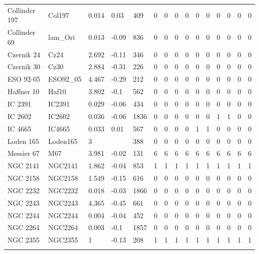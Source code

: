 \documentclass[fleqn,usenatbib]{mnras}
\begin{document}
\begin{table}
\begin{tabular}{|l l l l l || c c c c c | c c c c c|}
            Collinder 197 & Col197 & 0.014 & 0.03 & 409 & 0 & 0 & 0 & 0 & 0 & 0 & 0 & 0 & 0 & 0\\
            Collinder 69 & lam\_Ori & 0.013 & -0.09 & 836 & 0 & 0 & 0 & 0 & 0 & 0 & 0 & 0 & 0 & 0\\
            Czernik 24 & Cz24 & 2.692 & -0.11 & 346 & 0 & 0 & 0 & 0 & 0 & 0 & 0 & 0 & 0 & 0\\
            Czernik 30 & Cz30 & 2.884 & -0.31 & 226 & 0 & 0 & 0 & 0 & 0 & 0 & 0 & 0 & 0 & 0\\
            ESO 92-05 & ESO92\_05 & 4.467 & -0.29 & 212 & 0 & 0 & 0 & 0 & 0 & 0 & 0 & 0 & 0 & 0\\
            Haffner 10 & Haf10 & 3.802 & -0.1 & 562 & 0 & 0 & 0 & 0 & 0 & 0 & 0 & 0 & 0 & 0\\
            IC 2391 & IC2391 & 0.029 & -0.06 & 434 & 0 & 0 & 0 & 0 & 0 & 0 & 0 & 0 & 0 & 0\\
            \rowcolor{lightgray}
            IC 2602 & IC2602 & 0.036 & -0.06 & 1836 & 0 & 0 & 0 & 0 & 0 & 0 & 1 & 1 & 0 & 0\\
            \rowcolor{lightgray}
            IC 4665 & IC4665 & 0.033 & 0.01 & 567 & 0 & 0 & 0 & 0 & 1 & 1 & 0 & 0 & 0 & 0\\
            Loden 165 & Loden165 & 3 &  & 388 & 0 & 0 & 0 & 0 & 0 & 0 & 0 & 0 & 0 & 0\\
            \rowcolor{lightgray}
            Messier 67 & M67 & 3.981 & -0.02 & 131 & 6 & 6 & 6 & 6 & 6 & 6 & 6 & 6 & 6 & 6\\
            \rowcolor{lightgray}
            NGC 2141 & NGC2141 & 1.862 & -0.04 & 853 & 1 & 1 & 1 & 1 & 1 & 1 & 1 & 1 & 1 & 1\\
            NGC 2158 & NGC2158 & 1.549 & -0.15 & 616 & 0 & 0 & 0 & 0 & 0 & 0 & 0 & 0 & 0 & 0\\
            NGC 2232 & NGC2232 & 0.018 & -0.03 & 1866 & 0 & 0 & 0 & 0 & 0 & 0 & 0 & 0 & 0 & 0\\
            NGC 2243 & NGC2243 & 4.365 & -0.45 & 661 & 0 & 0 & 0 & 0 & 0 & 0 & 0 & 0 & 0 & 0\\
            NGC 2244 & NGC2244 & 0.004 & -0.04 & 452 & 0 & 0 & 0 & 0 & 0 & 0 & 0 & 0 & 0 & 0\\
            NGC 2264 & NGC2264 & 0.003 & -0.1 & 1857 & 0 & 0 & 0 & 0 & 0 & 0 & 0 & 0 & 0 & 0\\
            \rowcolor{lightgray}
            NGC 2355 & NGC2355 & 1 & -0.13 & 208 & 1 & 1 & 1 & 1 & 1 & 1 & 1 & 1 & 1 & 1\\
            \rowcolor{lightgray}

\end{tabular}
\end{table}
\end{document}
